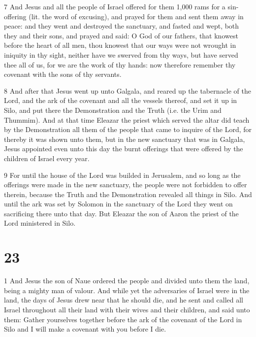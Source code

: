 \par 7 And Jesus and all the people of Israel offered for them 1,000 rams for a sin-offering (lit. the word of excusing), and prayed for them and sent them away in peace: and they went and destroyed the sanctuary, and fasted and wept, both they and their sons, and prayed and said: O God of our fathers, that knowest before the heart of all men, thou knowest that our ways were not wrought in iniquity in thy sight, neither have we swerved from thy ways, but have served thee all of us, for we are the work of thy hands: now therefore remember thy covenant with the sons of thy servants.

\par 8 And after that Jesus went up unto Galgala, and reared up the tabernacle of the Lord, and the ark of the covenant and all the vessels thereof, and set it up in Silo, and put there the Demonstration and the Truth (i.e. the Urim and Thummim). And at that time Eleazar the priest which served the altar did teach by the Demonstration all them of the people that came to inquire of the Lord, for thereby it was shown unto them, but in the new sanctuary that was in Galgala, Jesus appointed even unto this day the burnt offerings that were offered by the children of Israel every year. 

\par 9 For until the house of the Lord was builded in Jerusalem, and so long as the offerings were made in the new sanctuary, the people were not forbidden to offer therein, because the Truth and the Demonstration revealed all things in Silo. And until the ark was set by Solomon in the sanctuary of the Lord they went on sacrificing there unto that day. But Eleazar the son of Aaron the priest of the Lord ministered in Silo.



\chapter{23}

\par 1 And Jesus the son of Naue ordered the people and divided unto them the land, being a mighty man of valour. And while yet the adversaries of Israel were in the land, the days of Jesus drew near that he should die, and he sent and called all Israel throughout all their land with their wives and their children, and said unto them: Gather yourselves together before the ark of the covenant of the Lord in Silo and I will make a covenant with you before I die. 

